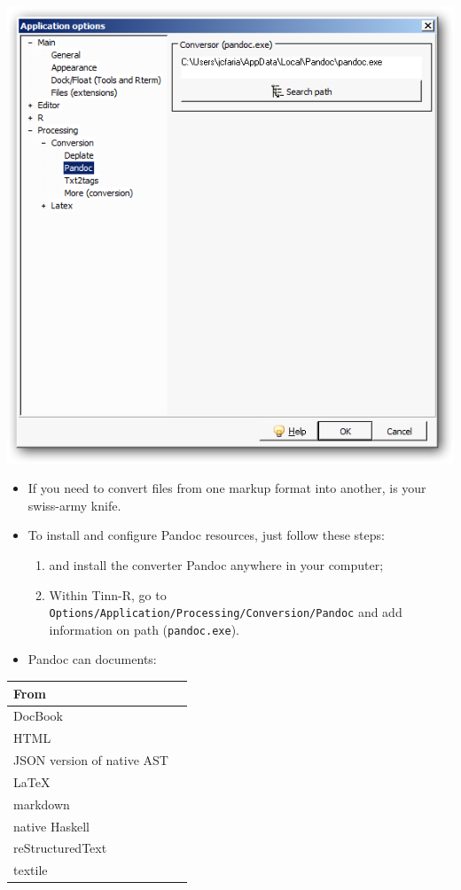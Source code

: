\includegraphics[scale=0.50]{./res/app_processing_conversion_pandoc.png}

\begin{itemize}
\item If you need to convert files from one markup format into another,  is your swiss-army knife.
\item To install and configure Pandoc resources, just follow these steps:
 \begin{enumerate}
 \item {} and install the converter Pandoc anywhere in your computer;
 \item Within Tinn-R, go to \texttt{Options/Application/Processing/Conversion/Pandoc} and add information on path (\texttt{pandoc.exe}).

 \end{enumerate}
\item Pandoc can  documents:
\end{itemize}

\begin{footnotesize}\begin{tabularx}{130pt}{lX} \\
\hline
\textbf{From} \\
\hline
  DocBook \\
  HTML \\
  JSON version of native AST \\
  LaTeX \\
  markdown \\
  native Haskell \\
  reStructuredText \\
  textile \\
\hline
\end{tabularx}\end{footnotesize}

